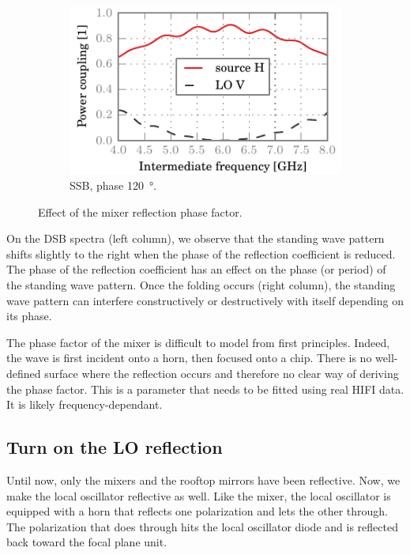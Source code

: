 \begin{figure}[hbtp]
\begin{subfigure}[b]{.5\textwidth}
        \includegraphics{chapter_3/11_phase_b_h_ssb}%
        \caption{SSB, phase \SI{120}{\degree}.}
    \end{subfigure}%
    \caption{Effect of the mixer reflection phase factor.}
    \label{fig:mixer_phase_factor}
\end{figure}

On the DSB spectra (left column), we observe that the standing wave pattern shifts slightly to the right when the phase of the reflection coefficient is reduced.
The phase of the reflection coefficient has an effect on the phase (or period) of the standing wave pattern.
Once the folding occurs (right column), the standing wave pattern can interfere constructively or destructively with itself depending on its phase.

The phase factor of the mixer is difficult to model from first principles.
Indeed, the wave is first incident onto a horn, then focused onto a chip.
There is no well-defined surface where the reflection occurs and therefore no clear way of deriving the phase factor.
This is a parameter that needs to be fitted using real HIFI data.
It is likely frequency-dependant.

\clearpage
\subsection{Turn on the LO reflection}
Until now, only the mixers and the rooftop mirrors have been reflective.
Now, we make the local oscillator reflective as well.
Like the mixer, the local oscillator is equipped with a horn that reflects one polarization and lets the other through.
The polarization that does through hits the local oscillator diode and is reflected back toward the focal plane unit.


